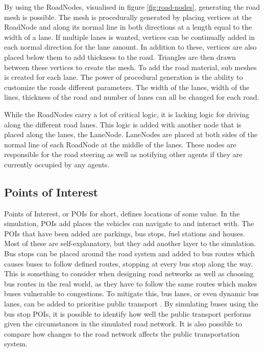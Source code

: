         By using the RoadNodes, visualised in figure \ref{fig:road-nodes}, generating the road mesh is possible. The mesh is procedurally generated by placing vertices at the RoadNode and along its normal line in both directions at a length equal to the width of a lane. If multiple lanes is wanted, vertices can be continually added in each normal direction for the lane amount. In addition to these, vertices are also placed below them to add thickness to the road. Triangles are then drawn between these vertices to create the mesh. To add the road material, sub meshes is created for each lane. The power of procedural generation is the ability to customize the roads different parameters. The width of the lanes, width of the lines, thickness of the road and number of lanes can all be changed for each road.
    
    
    
        While the RoadNodes carry a lot of critical logic, it is lacking logic for driving along the different road lanes. This logic is added with another node that is placed along the lanes, the LaneNode. LaneNodes are placed at both sides of the normal line of each RoadNode at the middle of the lanes. These nodes are responsible for the road steering as well as notifying other agents if they are currently occupied by any agents.
    

    \subsection{Points of Interest} \label{poi}
        Points of Interest, or POIs for short, defines locations of some value. In the simulation, POIs add places the vehicles can navigate to and interact with. The POIs that have been added are parkings, bus stops, fuel stations and houses. Most of these are self-explanatory, but they add another layer to the simulation. Bus stops can be placed around the road system and added to bus routes which causes buses to follow defined routes, stopping at every bus stop along the way. This is something to consider when designing road networks as well as choosing bus routes in the real world, as they have to follow the same routes which makes buses vulnerable to congestions. To mitigate this, bus lanes, or even dynamic bus lanes, can be added to prioritise public transport \cite{bus-lanes}. By simulating buses using the bus stop POIs, it is possible to identify how well the public transport performs given the circumstances in the simulated road network. It is also possible to compare how changes to the road network affects the public transportation system.

